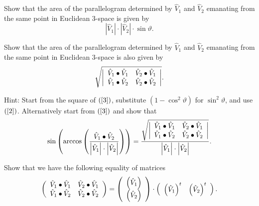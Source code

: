 \documentclass{ximera}
\begin{document}
\begin{exercise}
Show that the area of the parallelogram determined by $\hat{V}_{1}$ and
$\hat{V}_{2}$ emanating from the same point in Euclidean $3$-space is given by%
\begin{equation}
\left\vert \hat{V}_{1}\right\vert \cdot\left\vert \hat{V}_{2}\right\vert
\cdot\sin\vartheta. \label{3}%
\end{equation}

\end{exercise}

\begin{exercise}
\label{9}Show that the area of the parallelogram determined by $\hat{V}_{1}$
and $\hat{V}_{2}$ emanating from the same point in Euclidean $3$-space is also
given by%
\[
\sqrt{\left\vert
\begin{array}
[c]{cc}%
\hat{V}_{1}\bullet\hat{V}_{1} & \hat{V}_{2}\bullet\hat{V}_{1}\\
\hat{V}_{1}\bullet\hat{V}_{2} & \hat{V}_{2}\bullet\hat{V}_{2}%
\end{array}
\right\vert }.
\]


Hint: Start from the square of $\left(  \ref{3}\right)  $, substitute $\left(
1-\cos^{2}\vartheta\right)  $ for $\sin^{2}\vartheta$, and use
$\left(  \ref{2}\right)  $. Alternatively start from $\left(  \ref{3}\right)
$ and show that%
\[
\sin\left(  \arccos\left(  \frac{\hat{V}_{1}\bullet\hat{V}%
_{2}}{\left\vert \hat{V}_{1}\right\vert \cdot\left\vert \hat{V}_{2}\right\vert
}\right)  \right)  =\frac{\sqrt{\left\vert
\begin{array}
[c]{cc}%
\hat{V}_{1}\bullet\hat{V}_{1} & \hat{V}_{2}\bullet\hat{V}_{1}\\
\hat{V}_{1}\bullet\hat{V}_{2} & \hat{V}_{2}\bullet\hat{V}_{2}%
\end{array}
\right\vert }}{\left\vert \hat{V}_{1}\right\vert \cdot\left\vert \hat{V}%
_{2}\right\vert }.
\]

\end{exercise}

\begin{exercise}
Show that we have the following equality of matrices%
\[
\left(
\begin{array}
[c]{cc}%
\hat{V}_{1}\bullet\hat{V}_{1} & \hat{V}_{2}\bullet\hat{V}_{1}\\
\hat{V}_{1}\bullet\hat{V}_{2} & \hat{V}_{2}\bullet\hat{V}_{2}%
\end{array}
\right)  =\left(
\begin{array}
[c]{c}%
\left(  \hat{V}_{1}\right) \\
\left(  \hat{V}_{2}\right)
\end{array}
\right)  \cdot\left(
\begin{array}
[c]{cc}%
\left(  \hat{V}_{1}\right)  ^{t} & \left(  \hat{V}_{2}\right)  ^{t}%
\end{array}
\right)  .
\]

\end{exercise}
\end{document}
